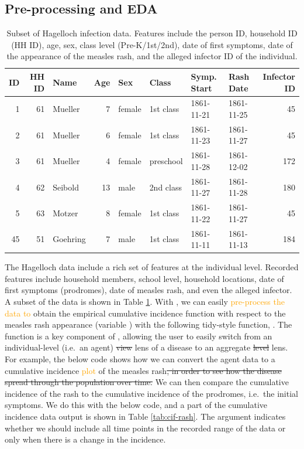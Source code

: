 \documentclass[
  shortnames]{jss}
\begin{document}
\subsection{Pre-processing and EDA}

\begin{CodeChunk}
\begin{table}[!h]

\caption{\label{tab:hags-people}Subset of Hagelloch infection data.  Features include the person ID, household ID (HH ID), age, sex, class level (Pre-K/1st/2nd), date of first symptoms, date of the appearance of the measles rash, and the alleged infector ID of the individual.}
\centering
\begin{tabular}[t]{rrlrllllr}
\toprule
ID & HH ID & Name & Age & Sex & Class & Symp. Start & Rash Date & Infector ID\\
\midrule
1 & 61 & Mueller & 7 & female & 1st class & 1861-11-21 & 1861-11-25 & 45\\
2 & 61 & Mueller & 6 & female & 1st class & 1861-11-23 & 1861-11-27 & 45\\
3 & 61 & Mueller & 4 & female & preschool & 1861-11-28 & 1861-12-02 & 172\\
4 & 62 & Seibold & 13 & male & 2nd class & 1861-11-27 & 1861-11-28 & 180\\
5 & 63 & Motzer & 8 & female & 1st class & 1861-11-22 & 1861-11-27 & 45\\
45 & 51 & Goehring & 7 & male & 1st class & 1861-11-11 & 1861-11-13 & 184\\
\bottomrule
\end{tabular}
\end{table}

\end{CodeChunk}

The Hagelloch data include a rich set of features at the individual
level. Recorded features include household members, school level,
household locations, date of first symptoms (prodromes), date of measles
rash, and even the alleged infector. A subset of the data is shown in
Table \ref{tab:hags-people}. With , we can easily
\textcolor{orange}{pre-process the data to} obtain the empirical
cumulative incidence function with respect to the measles rash
appearance (variable ) with the following tidy-style function,
. The function 
is a key component of , allowing the user to easily
switch from an individual-level (i.e.~an agent) \sout{view} lens of a
disease to an aggregate \sout{level} lens. For example, the below code
shows how we can convert the agent data to a cumulative incidence
\textcolor{orange}{plot} of the measles
rash\sout{, in order to see how the disease spread through the population over time.}
We can then compare the cumulative incidence of the rash to the
cumulative incidence of the prodromes, i.e.~the initial symptoms. We do
this with the below code, and a part of the cumulative incidence data
output is shown in Table \ref{tab:cif-rash}. The argument
 indicates whether we should include all
time points in the recorded range of the data or only when there is a
change in the incidence.
\end{document}
